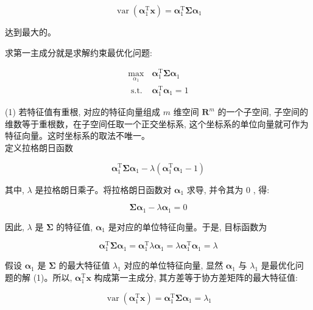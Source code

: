 \documentclass[10pt]{article}
\begin{document}
$$
\operatorname{var}\left(\boldsymbol{\alpha}_{1}^{\mathrm{T}} \boldsymbol{x}\right)=\boldsymbol{\alpha}_{1}^{\mathrm{T}} \boldsymbol{\Sigma} \boldsymbol{\alpha}_{1}
$$

达到最大的。

求第一主成分就是求解约束最优化问题:

\[
\begin{array}{ll}
\max _{\alpha_{1}} & \boldsymbol{\alpha}_{1}^{\mathrm{T}} \boldsymbol{\Sigma} \boldsymbol{\alpha}_{1}  \tag{16.7}\\
\text { s.t. } & \boldsymbol{\alpha}_{1}^{\mathrm{T}} \boldsymbol{\alpha}_{1}=1
\end{array}
\]

(1) 若特征值有重根, 对应的特征向量组成 $m$ 维空间 $\boldsymbol{R}^{m}$ 的一个子空间, 子空间的维数等于重根数，在子空间任取一个正交坐标系, 这个坐标系的单位向量就可作为特征向量。这时坐标系的取法不唯一。\\
定义拉格朗日函数

$$
\boldsymbol{\alpha}_{1}^{\mathrm{T}} \boldsymbol{\Sigma} \boldsymbol{\alpha}_{1}-\lambda\left(\boldsymbol{\alpha}_{1}^{\mathrm{T}} \boldsymbol{\alpha}_{1}-1\right)
$$

其中, $\lambda$ 是拉格朗日乘子。将拉格朗日函数对 $\boldsymbol{\alpha}_{1}$ 求导, 并令其为 0 , 得:

$$
\boldsymbol{\Sigma} \boldsymbol{\alpha}_{1}-\lambda \boldsymbol{\alpha}_{1}=0
$$

因此, $\lambda$ 是 $\boldsymbol{\Sigma}$ 的特征值, $\boldsymbol{\alpha}_{1}$ 是对应的单位特征向量。于是, 目标函数为

$$
\boldsymbol{\alpha}_{1}^{\mathrm{T}} \boldsymbol{\Sigma} \boldsymbol{\alpha}_{1}=\boldsymbol{\alpha}_{1}^{\mathrm{T}} \lambda \boldsymbol{\alpha}_{1}=\lambda \boldsymbol{\alpha}_{1}^{\mathrm{T}} \boldsymbol{\alpha}_{1}=\lambda
$$

假设 $\boldsymbol{\alpha}_{1}$ 是 $\boldsymbol{\Sigma}$ 的最大特征值 $\lambda_{1}$ 对应的单位特征向量, 显然 $\boldsymbol{\alpha}_{1}$ 与 $\lambda_{1}$ 是最优化问题的解 (1)。所以, $\boldsymbol{\alpha}_{1}^{\mathrm{T}} \boldsymbol{x}$ 构成第一主成分, 其方差等于协方差矩阵的最大特征值:


\begin{equation*}
\operatorname{var}\left(\boldsymbol{\alpha}_{1}^{\mathrm{T}} \boldsymbol{x}\right)=\boldsymbol{\alpha}_{1}^{\mathrm{T}} \boldsymbol{\Sigma} \boldsymbol{\alpha}_{1}=\lambda_{1} \tag{16.8}
\end{equation*}
\end{document}
